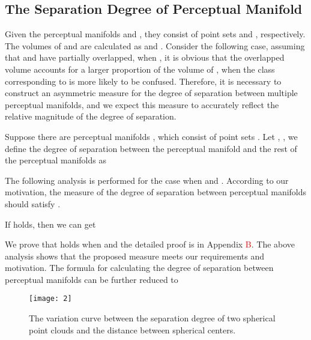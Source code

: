 \documentclass[10pt,twocolumn,letterpaper]{article}
\begin{document}
\subsection{The Separation Degree of Perceptual Manifold}
\label{sec3.3}
\iffalse
Euclidean or cosine distances between class centers are often applied to measure inter-class distances, and these two distances are also commonly used as loss functions when constructing sample pairs. However, maximizing the distance between proxy points or samples cannot keep a class away from all the remaining classes at the same time, and the distance between class centers does not reflect the degree of overlap of the distribution. In this section, we propose a measure of the separation degree between perceptual manifolds.
\fi

Given the perceptual manifolds  and , they consist of point sets  and , respectively. The volumes of  and  are calculated as  and . Consider the following case, assuming that  and  have partially overlapped, when , it is obvious that the overlapped volume accounts for a larger proportion of the volume of , when the class corresponding to  is more likely to be confused. Therefore, it is necessary to construct an asymmetric measure for the degree of separation between multiple perceptual manifolds, and we expect this measure to accurately reflect the relative magnitude of the degree of separation.

Suppose there are  perceptual manifolds , which consist of point sets . Let , , we define the degree of separation between the perceptual manifold  and the rest of the perceptual manifolds as 

The following analysis is performed for the case when  and . According to our motivation, the measure of the degree of separation between perceptual manifolds should satisfy . 

If  holds, then we can get 
\begin{small}

\end{small}
We prove that  holds when  and the detailed proof is in Appendix \textcolor{red}{B}. The above analysis shows that the proposed measure meets our requirements and motivation. The formula for calculating the degree of separation between perceptual manifolds can be further reduced to 



\begin{figure}[t]
\centering
\centerline{\texttt{[image: 2]}}
\vskip -0.12in
\caption{The variation curve between the separation degree of two spherical point clouds and the distance between spherical centers.}
\label{fig2}
\vskip -0.25in
\end{figure}
\end{document}
